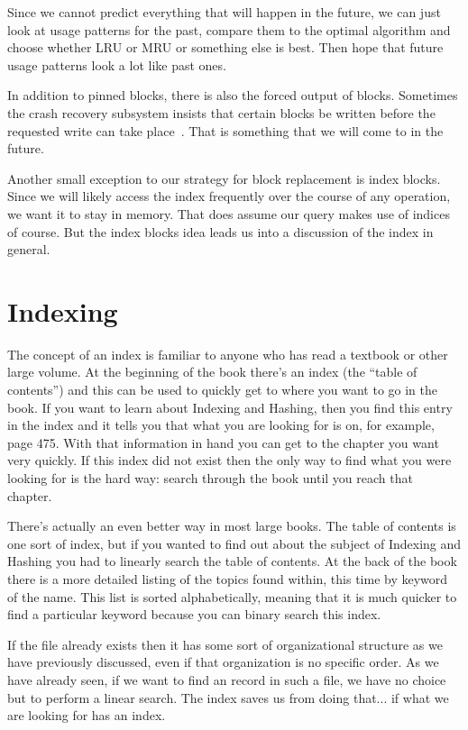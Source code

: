Since we cannot predict everything that will happen in the future, we can just look at usage patterns for the past, compare them to the optimal algorithm and choose whether LRU or MRU or something else is best. Then hope that future usage patterns look a lot like past ones.

In addition to pinned blocks, there is also the forced output of blocks. Sometimes the crash recovery subsystem insists that certain blocks be written before the requested write can take place~\cite{dsc}. That is something that we will come to in the future. 


Another small exception to our strategy for block replacement is index blocks. Since we will likely access the index frequently over the course of any operation, we want it to stay in memory. That does assume our query makes use of indices of course. But the index blocks idea leads us into a discussion of the index in general.

\section*{Indexing}

The concept of an index is familiar to anyone who has read a textbook or other large volume. At the beginning of the book there's an index (the ``table of contents'') and this can be used to quickly get to where you want to go in the book. If you want to learn about Indexing and Hashing, then you find this entry in the index and it tells you that what you are looking for is on, for example, page 475. With that information in hand you can get to the chapter you want very quickly. If this index did not exist then the only way to find what you were looking for is the hard way: search through the book until you reach that chapter.

There's actually an even better way in most large books. The table of contents is one sort of index, but if you wanted to find out about the subject of Indexing and Hashing you had to linearly search the table of contents. At the back of the book there is a more detailed listing of the topics found within, this time by keyword of the name. This list is sorted alphabetically, meaning that it is much quicker to find a particular keyword because you can binary search this index.

If the file already exists then it has some sort of organizational structure as we have previously discussed, even if that organization is no specific order. As we have already seen, if we want to find an record in such a file, we have no choice but to perform a linear search. The index saves us from doing that... if what we are looking for has an index.

